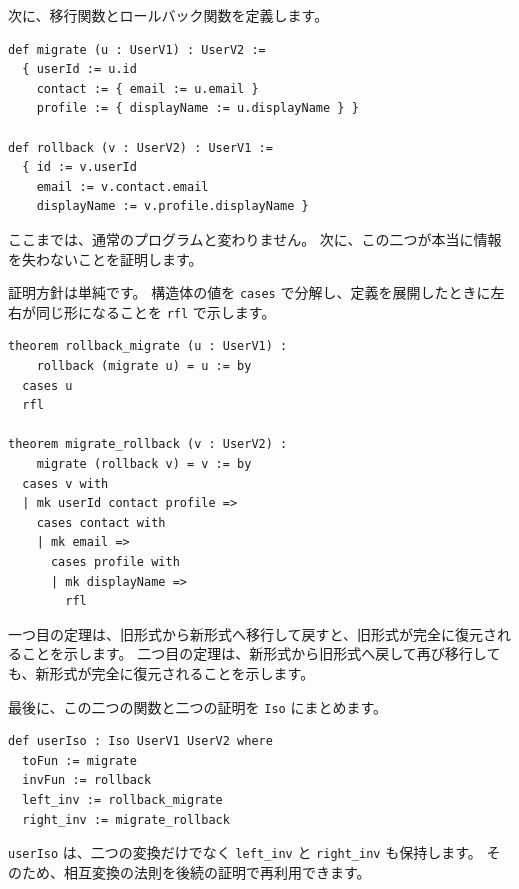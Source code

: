 次に、移行関数とロールバック関数を定義します。

\begin{listing}[htbp]
\begin{verbatim}
def migrate (u : UserV1) : UserV2 :=
  { userId := u.id
    contact := { email := u.email }
    profile := { displayName := u.displayName } }

def rollback (v : UserV2) : UserV1 :=
  { id := v.userId
    email := v.contact.email
    displayName := v.profile.displayName }
\end{verbatim}
\caption{\texttt{migrate} と \texttt{rollback}}
\label{lst:ch12_user_functions}
\end{listing}

ここまでは、通常のプログラムと変わりません。
次に、この二つが本当に情報を失わないことを証明します。

証明方針は単純です。
構造体の値を \texttt{cases} で分解し、定義を展開したときに左右が同じ形になることを \texttt{rfl} で示します。

\begin{listing}[htbp]
\begin{verbatim}
theorem rollback_migrate (u : UserV1) :
    rollback (migrate u) = u := by
  cases u
  rfl

theorem migrate_rollback (v : UserV2) :
    migrate (rollback v) = v := by
  cases v with
  | mk userId contact profile =>
    cases contact with
    | mk email =>
      cases profile with
      | mk displayName =>
        rfl
\end{verbatim}
\caption{\texttt{rollback\_migrate} と \texttt{migrate\_rollback}}
\label{lst:ch12_user_roundtrip}
\end{listing}

一つ目の定理は、旧形式から新形式へ移行して戻すと、旧形式が完全に復元されることを示します。
二つ目の定理は、新形式から旧形式へ戻して再び移行しても、新形式が完全に復元されることを示します。

最後に、この二つの関数と二つの証明を \texttt{Iso} にまとめます。

\begin{listing}[htbp]
\begin{verbatim}
def userIso : Iso UserV1 UserV2 where
  toFun := migrate
  invFun := rollback
  left_inv := rollback_migrate
  right_inv := migrate_rollback
\end{verbatim}
\caption{\texttt{userIso}}
\label{lst:ch12_user_iso}
\end{listing}

\texttt{userIso} は、二つの変換だけでなく \texttt{left\_inv} と \texttt{right\_inv} も保持します。
そのため、相互変換の法則を後続の証明で再利用できます。

